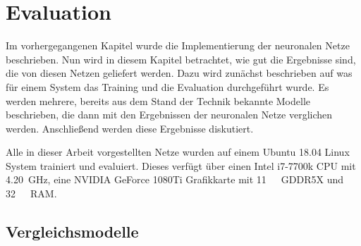 \chapter{Evaluation}
\label{cap:Eval}

Im vorhergegangenen Kapitel wurde die Implementierung der neuronalen Netze beschrieben.
Nun wird in diesem Kapitel betrachtet, wie gut die Ergebnisse sind, die von diesen Netzen geliefert werden.
Dazu wird zunächst beschrieben auf was für einem System das Training und die Evaluation durchgeführt wurde.
Es werden mehrere, bereits aus dem Stand der Technik bekannte Modelle beschrieben, die dann mit den Ergebnissen der neuronalen Netze 
verglichen werden.
Anschließend werden diese Ergebnisse diskutiert.


Alle in dieser Arbeit vorgestellten Netze wurden auf einem Ubuntu 18.04 Linux System trainiert und evaluiert.
Dieses verfügt über einen Intel i7-7700k CPU mit \SI{4.20}{\giga\hertz}, eine NVIDIA GeForce 1080Ti Grafikkarte mit \SI{11}{\giga\byte}~GDDR5X
und \SI{32}{\giga\byte}~RAM. 


\section{Vergleichsmodelle}




